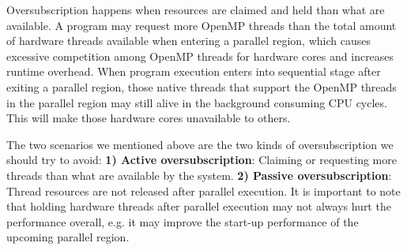 Oversubscription happens when resources are claimed and held than what are available.
A program may request more OpenMP threads than the total amount of hardware
threads available when entering a {\sf parallel} region, which causes excessive competition 
among OpenMP threads for hardware cores and increases runtime overhead. 
When program execution enters into sequential stage after exiting a {\sf parallel} region, 
those native threads that support the OpenMP threads in the parallel region may still 
alive in the background consuming CPU cycles. This 
will make those hardware cores unavailable to others. 


The two scenarios we mentioned above are the two kinds of oversubscription we should try to avoid:
{\bf 1) Active oversubscription}: Claiming or requesting more threads than 
what are available by the system.
{\bf 2) Passive oversubscription}: Thread resources are not released 
after parallel execution. It is important to note that holding hardware threads after parallel execution 
may not always hurt the performance overall, e.g. it may improve the start-up performance of the 
upcoming {\sf parallel} region. 

